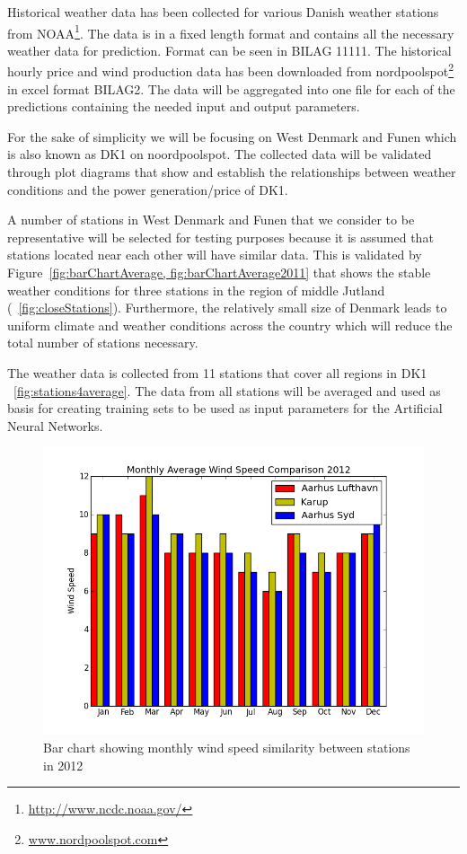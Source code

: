 Historical weather data has been collected for various Danish weather stations from NOAA\footnote{\url{http://www.ncdc.noaa.gov/}}. The data is in a fixed length format and contains all the necessary weather data for prediction. Format can be seen in BILAG 11111. 
The historical hourly price and wind production data has been downloaded from nordpoolspot\footnote{\url{www.nordpoolspot.com}} in excel format BILAG2.
The data will be aggregated into one file for each of the predictions containing the needed input and output parameters.

For the sake of simplicity we will be focusing on West Denmark and Funen which is also known as DK1 on noordpoolspot. The collected data will be validated through plot diagrams that show and establish the relationships between weather conditions and the power generation/price of DK1.

A number of stations in West Denmark and Funen that we consider to be representative will be selected for testing purposes because it is assumed that stations located near each other will have similar data. This is validated by Figure~\ref{fig:barChartAverage, fig:barChartAverage2011} that shows the stable weather conditions for three stations in the region of middle Jutland (~\ref{fig:closeStations}). Furthermore, the relatively small size of Denmark leads to uniform climate and weather conditions across the country which will reduce the total number of stations necessary.

The weather data is collected from 11 stations that cover all regions in DK1 ~\ref{fig:stations4average}. The data from all stations will be averaged and used as basis for creating training sets to be used as input parameters for the Artificial Neural Networks.
\begin{figure}[h!]
\centering
\includegraphics[width=0.99\linewidth,natwidth=898,natheight=587]{billeder/barChartMonthlyAverage.png}
\caption{Bar chart showing monthly wind speed similarity between stations in 2012}
\label{fig:barChartAverage}
\end{figure}

